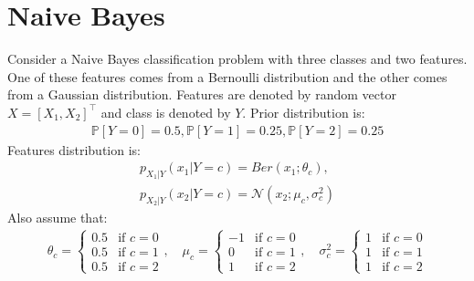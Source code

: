 \documentclass[12pt]{article}
\begin{document}
\section{Naive Bayes}
Consider a Naive Bayes classification problem with three classes and two features. One of these features comes from a Bernoulli distribution and the other comes from a Gaussian distribution. Features are denoted by random vector $X = {[X_1, X_2]}^\top$ and class is denoted by $Y$. Prior distribution is:
\begin{align*}
    \mathbb{P}[Y=0] = 0.5 , \mathbb{P}[Y=1] = 0.25 , \mathbb{P}[Y=2] = 0.25
\end{align*}
Features distribution is:
\begin{gather*}
    p_{X_1|Y}(x_1|Y=c) = Ber(x_1 ; \theta_c), \\
    p_{X_2|Y}(x_2|Y=c) = \mathcal{N}(x_2 ; \mu_c, \sigma_c^2)
\end{gather*}
Also assume that:
\begin{gather*}
    \theta_c = \begin{cases}
        0.5 & \text{if } c = 0 \\
        0.5 & \text{if } c = 1 \\
        0.5 & \text{if } c = 2
    \end{cases},
    \quad
    \mu_c = \begin{cases}
        -1 & \text{if } c = 0 \\
        0  & \text{if } c = 1 \\
        1  & \text{if } c = 2
    \end{cases},
    \quad
    \sigma_c^2 = \begin{cases}
        1 & \text{if } c = 0 \\
        1 & \text{if } c = 1 \\
        1 & \text{if } c = 2
    \end{cases}
\end{gather*}
\end{document}
